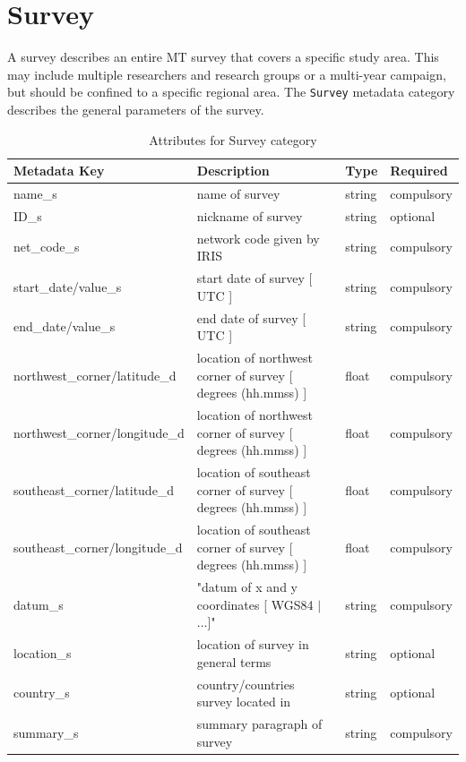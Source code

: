 \documentclass{article}
\begin{document}
\newpage
\section{Survey}

A survey describes an entire MT survey that covers a specific study area.  This may include multiple researchers and research groups or a multi-year campaign, but should be confined to a specific regional area.  The \verb|Survey| metadata category describes the general parameters of the survey. 

\begin{table}[htb!]
	\caption[Attributes for Survey]{Attributes for Survey category}
	\begin{tabular}{|l|l|l|l|}
		\hline
		\textbf{Metadata Key} & \textbf{Description} & \textbf{Type} & \textbf{Required} \\ \hline
		name\_s & name of survey & string & compulsory \\ \hline
		ID\_s & nickname of survey & string & optional \\ \hline
		net\_code\_s & network code given by IRIS & string & compulsory \\ \hline
		start\_date/value\_s & start date of survey [ UTC ] & string & compulsory \\ \hline
		end\_date/value\_s & end date of survey [ UTC ] & string & compulsory \\ \hline
		northwest\_corner/latitude\_d & location of northwest corner of survey [ degrees (hh.mmss) ] & float & compulsory \\ \hline
		northwest\_corner/longitude\_d & location of northwest corner of survey [ degrees (hh.mmss) ] & float & compulsory \\ \hline
		southeast\_corner/latitude\_d & location of southeast corner of survey  [ degrees (hh.mmss) ] & float & compulsory \\ \hline
		southeast\_corner/longitude\_d & location of southeast corner of survey  [ degrees (hh.mmss) ] & float & compulsory \\ \hline
		datum\_s & "datum of x and y coordinates [ WGS84 $|$ ...]" & string & compulsory \\ \hline
		location\_s & location of survey in general terms & string & optional \\ \hline
		country\_s & country/countries survey located in & string & optional \\ \hline
		summary\_s & summary paragraph of survey & string & compulsory \\ \hline

\end{tabular}
\end{table}
\end{document}
